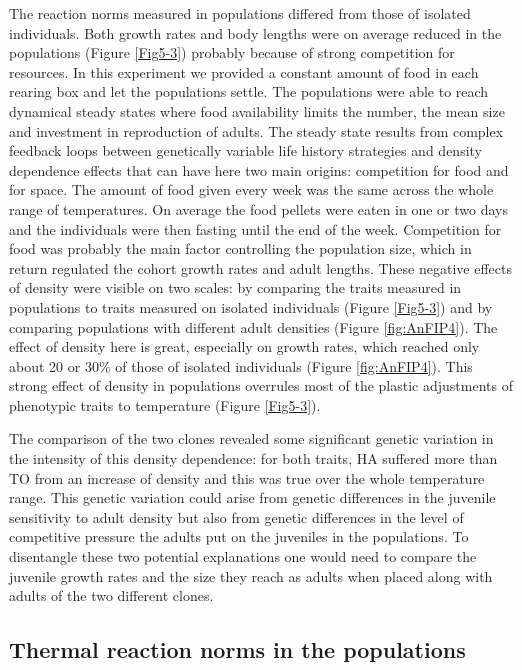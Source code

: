 The reaction norms measured in populations differed from those of isolated
individuals. Both growth rates and body lengths were on average reduced in the
populations (Figure \ref{Fig5-3}) probably because of strong competition for
resources.
In this experiment we provided a constant amount of food in each rearing box and
let the populations settle. The populations were able to reach dynamical steady
states where food availability limits the number, the mean size and investment
in reproduction of adults. The steady state results from complex feedback loops
between genetically variable life history strategies \autocites{tully2008a,stam1996a}
 and density dependence effects \autocites{kokko2007a} that can have here
 two main origins:
competition for food and for space. The amount of food given every week was the
same across the whole range of temperatures. On average the food pellets were
eaten in one or two days and the individuals were then fasting until the end of
the week. Competition for food was probably the main factor controlling the
population size, which in return regulated the cohort growth rates and adult
lengths. These negative effects of density were visible on two scales: by
comparing the traits measured in populations to traits measured on isolated
individuals (Figure \ref{Fig5-3}) and by comparing populations with different
adult densities (Figure \ref{fig:AnFIP4}). The effect of density here is great,
especially on growth rates, which reached only about 20 or $30\%$ of those of
isolated individuals (Figure \ref{fig:AnFIP4}). This strong effect of density in populations overrules most of the plastic
adjustments of phenotypic traits to temperature (Figure \ref{Fig5-3}).

The comparison of the two clones revealed some significant genetic variation in
the intensity of this density dependence: for both traits, HA suffered more than
TO from an increase of density and this was true over the whole temperature
range. This genetic variation could arise from genetic differences in the
juvenile sensitivity to adult density but also from genetic differences in the
level of competitive pressure the adults put on the juveniles in the
populations. To disentangle these two potential explanations one would need to
compare the juvenile growth rates and the size they reach as adults when placed
along with adults of the two different clones.


\subsection{Thermal reaction norms in the populations}

